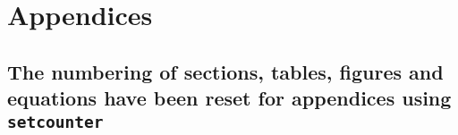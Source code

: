 \newpage
\setcounter{table}{0}
\setcounter{figure}{0}
\setcounter{section}{0}
\setcounter{equation}{0}
\renewcommand\thesection{A.\arabic{section}} 
\renewcommand\thefigure{A\arabic{figure}} 
\renewcommand\thetable{A\arabic{table}} 
\renewcommand\theequation{A\arabic{equation}} 

\chapter*{Appendices}

\section{The numbering of sections, tables, figures and equations have been reset for appendices using \texttt{setcounter}}

